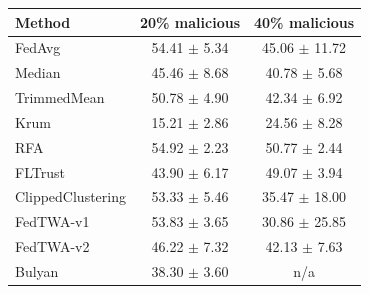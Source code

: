 \begin{tabular}{lcc}
\toprule
Method & 20\% malicious & 40\% malicious \\
\midrule
FedAvg & 54.41 $\pm$ 5.34 & 45.06 $\pm$ 11.72 \\
Median & 45.46 $\pm$ 8.68 & 40.78 $\pm$ 5.68 \\
TrimmedMean & 50.78 $\pm$ 4.90 & 42.34 $\pm$ 6.92 \\
Krum & 15.21 $\pm$ 2.86 & 24.56 $\pm$ 8.28 \\
RFA & 54.92 $\pm$ 2.23 & 50.77 $\pm$ 2.44 \\
FLTrust & 43.90 $\pm$ 6.17 & 49.07 $\pm$ 3.94 \\
ClippedClustering & 53.33 $\pm$ 5.46 & 35.47 $\pm$ 18.00 \\
FedTWA-v1 & 53.83 $\pm$ 3.65 & 30.86 $\pm$ 25.85 \\
FedTWA-v2 & 46.22 $\pm$ 7.32 & 42.13 $\pm$ 7.63 \\
Bulyan & 38.30 $\pm$ 3.60 & n/a \\
\bottomrule
\end{tabular}